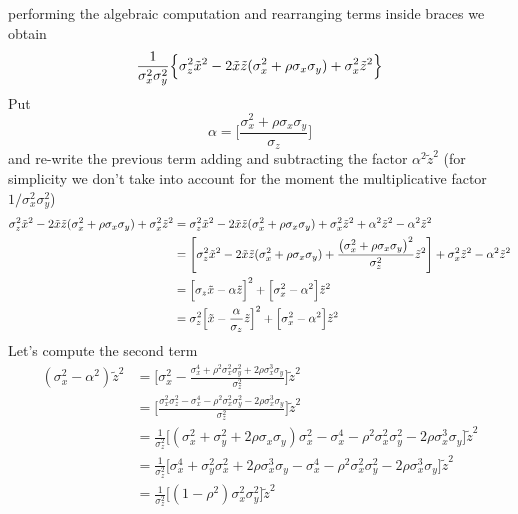\documentclass{article}
\begin{document}
performing the algebraic computation and rearranging terms inside braces we obtain
\begin{equation}
    \frac{1}{\sigma^2_x \sigma^2_y}
    \Bigl\{
        \sigma^2_z {\tilde x}^2 - 2 \tilde x \tilde z (\sigma^2_x + \rho \sigma_x \sigma_y ) + \sigma_x^2 {\tilde z}^2
    \Bigr\}
\end{equation}
Put
\begin{equation}
    \alpha = \Biggl[   
        \frac{\sigma^2_x + \rho \sigma_x \sigma_y}{\sigma_z}
    \Biggr]
\end{equation}
and re-write the previous term adding and subtracting the factor $\alpha^2 {\tilde z}^2$ (for simplicity we don't take into account for the moment the multiplicative factor $1/\sigma_x^2\sigma_y^2$)
\begin{equation}
    \begin{split}
        \sigma^2_z {\tilde x}^2 - 2 \tilde x \tilde z (\sigma^2_x + \rho \sigma_x \sigma_y ) + \sigma_x^2 {\tilde z}^2  & = \sigma^2_z {\tilde x}^2 - 2 \tilde x \tilde z (\sigma^2_x + \rho \sigma_x \sigma_y ) + \sigma_x^2 {\tilde z}^2 + \alpha^2 {\tilde z}^2 - \alpha^2 {\tilde z}^2 \\    
        & = \Biggl[ \sigma^2_z {\tilde x}^2 - 2 \tilde x \tilde z (\sigma^2_x + \rho \sigma_x \sigma_y ) +
        \frac{\bigl(\sigma_x^2 + \rho \sigma_x \sigma_y \bigr)^2}{\sigma^2_z} {\tilde z}^2 \Biggr] + \sigma^2_x {\tilde z}^2 - \alpha^2 {\tilde z}^2  \\
        & = \Bigl[ \sigma_z {\tilde x} - \alpha {\tilde z} \Bigr]^2 + \Bigl[\sigma_x^2 - \alpha^2 \Bigr] {\tilde z}^2 \\
        & = \sigma_z^2 \Bigl[ {\tilde x} - \frac{\alpha}{\sigma_z} {\tilde z} \Bigr]^2 + \Bigl[\sigma_x^2 - \alpha^2 \Bigr] {\tilde z}^2
    \end{split}
\end{equation}
Let's compute the second term
\begin{equation}
    \begin{split}
        (\sigma^2_x - \alpha^2) {\tilde z}^2 & = 
        \Biggl[
            \sigma^2_x - \frac{\sigma^4_x + \rho^2 \sigma^2_x \sigma^2_y + 2 \rho \sigma^3_x \sigma_y}{\sigma^2_z}
        \Biggr] {\tilde z}^2\\
        & = \Biggl[ 
                \frac{\sigma^2_x \sigma^2_z - \sigma^4_x - \rho^2 \sigma^2_x \sigma^2_y - 2 \rho \sigma^3_x \sigma_y}{\sigma^2_z} 
            \Biggr] {\tilde z}^2\\
        & = \frac{1}{\sigma^2_z} 
            \Biggl[
                (\sigma_x^2 + \sigma_y^2 + 2 \rho \sigma_x \sigma_y) \sigma^2_x  - \sigma^4_x - \rho^2 \sigma^2_x \sigma^2_y - 2 \rho \sigma^3_x \sigma_y
            \Biggr] {\tilde z}^2 \\
        & = \frac{1}{\sigma^2_z} 
            \Biggl[
                \sigma_x^4 + \sigma^2_y \sigma^2_x + 2 \rho \sigma^3_x \sigma_y
                - \sigma^4_x - \rho^2 \sigma^2_x \sigma^2_y - 2 \rho \sigma^3_x \sigma_y
            \Biggr] {\tilde z}^2 \\
        & = \frac{1}{\sigma^2_z} 
            \Biggl[
                (1-\rho^2)\sigma_x^2 \sigma_y^2
            \Biggr] {\tilde z}^2
    \end{split}
\end{equation}
\end{document}
